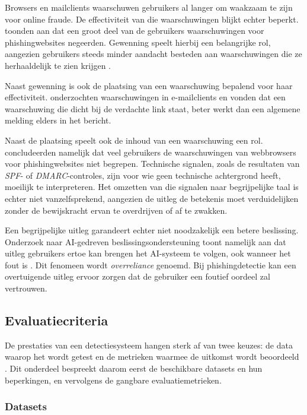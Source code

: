 Browsers en mailclients waarschuwen gebruikers al langer om waakzaam te zijn voor online fraude. De effectiviteit van die waarschuwingen blijkt echter beperkt. \textcite{Egelman2008} toonden aan dat een groot deel van de gebruikers waarschuwingen voor phishingwebsites negeerden. Gewenning speelt hierbij een belangrijke rol, aangezien gebruikers steeds minder aandacht besteden aan waarschuwingen die ze herhaaldelijk te zien krijgen \autocite{Anderson2015}.

Naast gewenning is ook de plaatsing van een waarschuwing bepalend voor haar effectiviteit. \textcite{Petelka2019} onderzochten waarschuwingen in e-mailclients en vonden dat een waarschuwing die dicht bij de verdachte link staat, beter werkt dan een algemene melding elders in het bericht.

Naast de plaatsing speelt ook de inhoud van een waarschuwing een rol. \textcite{Egelman2008} concludeerden namelijk dat veel gebruikers de waarschuwingen van webbrowsers voor phishingwebsites niet begrepen. Technische signalen, zoals de resultaten van \emph{SPF}- of \emph{DMARC}-controles, zijn voor wie geen technische achtergrond heeft, moeilijk te interpreteren. Het omzetten van die signalen naar begrijpelijke taal is echter niet vanzelfsprekend, aangezien de uitleg de betekenis moet verduidelijken zonder de bewijskracht ervan te overdrijven of af te zwakken. 

Een begrijpelijke uitleg garandeert echter niet noodzakelijk een betere beslissing. Onderzoek naar AI-gedreven beslissingsondersteuning toont namelijk aan dat uitleg gebruikers ertoe kan brengen het AI-systeem te volgen, ook wanneer het fout is \autocite{Bucinca2021}. Dit fenomeen wordt \emph{overreliance} genoemd. Bij phishingdetectie kan een overtuigende uitleg ervoor zorgen dat de gebruiker een foutief oordeel zal vertrouwen. 

\subsection{Evaluatiecriteria}
\label{subsec:evaluatiecriteria}

De prestaties van een detectiesysteem hangen sterk af van twee keuzes: de data waarop het wordt getest en de metrieken waarmee de uitkomst wordt beoordeeld \autocite{Salloum2022}. Dit onderdeel bespreekt daarom eerst de beschikbare datasets en hun beperkingen, en vervolgens de gangbare evaluatiemetrieken.

\subsubsection{Datasets}
\label{subsubsec:datasets}

